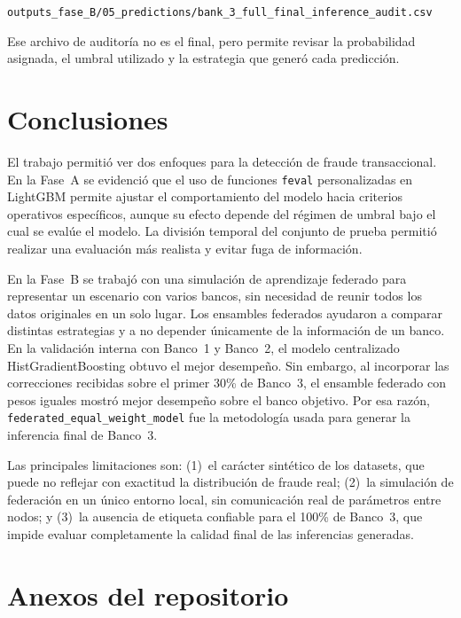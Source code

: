 \documentclass[10pt,a4paper]{article}
\begin{document}
\begin{center}
\nolinkurl{outputs_fase_B/05_predictions/bank_3_full_final_inference_audit.csv}
\end{center}

Ese archivo de auditoría no es el final, pero permite revisar la
probabilidad asignada, el umbral utilizado y la estrategia que generó cada predicción.

\section{Conclusiones}

El trabajo permitió ver dos enfoques para la detección de fraude transaccional.
En la Fase~A se evidenció que el uso de funciones \texttt{feval} personalizadas en LightGBM
permite ajustar el comportamiento del modelo hacia criterios operativos específicos,
aunque su efecto depende del régimen de umbral bajo el cual se evalúe el modelo.
La división temporal del conjunto de prueba permitió realizar una evaluación más realista y 
evitar fuga de información.

En la Fase~B se trabajó con una simulación de aprendizaje federado para representar un
escenario con varios bancos, sin necesidad de reunir todos los datos originales en un solo
lugar. Los ensambles federados ayudaron a comparar distintas estrategias y a no depender
únicamente de la información de un banco. En la validación interna con Banco~1 y Banco~2,
el modelo centralizado HistGradientBoosting obtuvo el mejor desempeño. Sin embargo, al
incorporar las correcciones recibidas sobre el primer 30\% de Banco~3, el ensamble federado
con pesos iguales mostró mejor desempeño sobre el banco objetivo. Por esa razón,
\texttt{federated\_equal\_weight\_model} fue la metodología usada para generar la
inferencia final de Banco~3.

Las principales limitaciones son: (1)~el carácter sintético de los datasets, que puede
no reflejar con exactitud la distribución de fraude real; (2)~la simulación de federación
en un único entorno local, sin comunicación real de parámetros entre nodos; y (3)~la ausencia de etiqueta 
confiable para el 100\% de Banco~3, que impide evaluar completamente la calidad final de las inferencias generadas.
\section{Anexos del repositorio}
\end{document}
